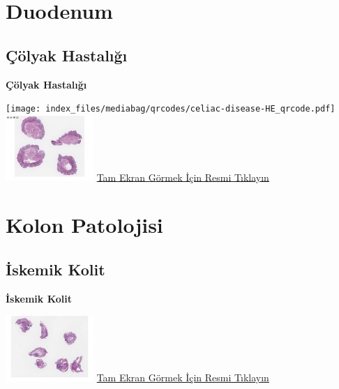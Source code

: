 \documentclass[
  letterpaper,
  DIV=11,
  numbers=noendperiod]{scrreprt}
\begin{document}
\hypertarget{section-19}{%
\chapter{}\label{section-19}}

\hypertarget{sec-duodenum}{%
\chapter{Duodenum}\label{sec-duodenum}}

\hypertarget{sec-colyak-hastaligi}{%
\section{Çölyak Hastalığı}\label{sec-colyak-hastaligi}}

\textbf{Çölyak Hastalığı}

\texttt{[image: index\_files/mediabag/qrcodes/celiac-disease-HE\_qrcode.pdf]}
\href{https://images.patolojiatlasi.com/celiac-disease/HE.html}{\includegraphics[width=0.25\textwidth,height=\textheight]{./screenshots/thumbnail_celiac-disease.png}}
\href{https://images.patolojiatlasi.com/celiac-disease/HE.html}{Tam
Ekran Görmek İçin Resmi Tıklayın}

\hypertarget{sec-kolon-patolojisi}{%
\chapter{Kolon Patolojisi}\label{sec-kolon-patolojisi}}

\hypertarget{sec-iskemik-kolit}{%
\section{İskemik Kolit}\label{sec-iskemik-kolit}}

\textbf{İskemik Kolit}

\href{https://images.patolojiatlasi.com/ischemic-colitis/HE.html}{\includegraphics[width=0.25\textwidth,height=\textheight]{./screenshots/thumbnail_ischemic-colitis.png}}
\href{https://images.patolojiatlasi.com/ischemic-colitis/HE.html}{Tam
Ekran Görmek İçin Resmi Tıklayın}
\end{document}
